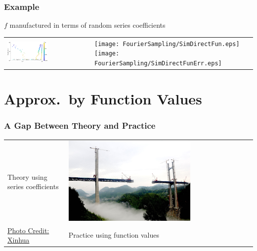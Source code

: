 \documentclass[11pt,compress,xcolor={usenames,dvipsnames},aspectratio=169]{beamer}
\begin{document}
\begin{frame}
\frametitle{Example}

\vspace{-3ex}
$f$ manufactured in terms of random series coefficients

\vspace{-2ex}

\begin{tabular}{>{\centering}m{}>{\centering}m{}}
\includegraphics[width= 0.5\textwidth]{FourierSampling/SimDirectErr.eps} &
\texttt{[image: FourierSampling/SimDirectFun.eps]} \newline
\texttt{[image: FourierSampling/SimDirectFunErr.eps]}
\end{tabular}

\end{frame}


\section{Approx.\ by Function Values}

\begin{frame}
\frametitle{A Gap Between Theory and Practice}

\vspace{-3ex}

\begin{tabular}{>{\flushright}m{}>{\centering}m{}>{\flushleft}m{}}
Theory using series coefficients
& \includegraphics[width=0.7\textwidth]{ProgramsImages/ChinaBridgeGap.jpg}
\\
\hfill \hfill \scriptsize{ \href{http://www.chinadaily.com.cn/china/2014-05/13/content_17504637_5.htm}{Photo Credit: Xinhua}}
& Practice using function values
\end{tabular}
\end{frame}
\end{document}
